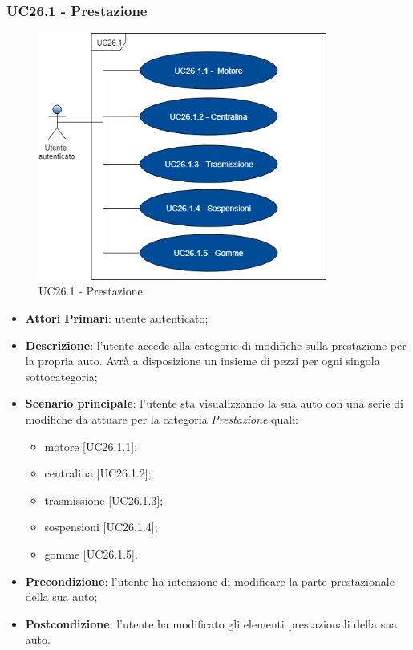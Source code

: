 \subsubsection{UC26.1 - Prestazione}
\begin{figure}[h]
	\includegraphics[width=9.5cm]{res/images/UC26-1Prestazioni.png}
	\centering
	\caption{UC26.1 - Prestazione}
\end{figure}
\begin{itemize}
	\item \textbf{Attori Primari}: utente autenticato;
	\item \textbf{Descrizione}: l'utente accede alla categorie di modifiche sulla prestazione per la propria auto. Avrà a disposizione un insieme di pezzi per ogni singola sottocategoria;
	\item \textbf{Scenario principale}: l'utente sta visualizzando la sua auto con una serie di modifiche da attuare per la categoria \textit{Prestazione} quali:
	\begin{itemize}
		\item motore [UC26.1.1];
		\item centralina [UC26.1.2];
		\item trasmissione [UC26.1.3];
		\item sospensioni [UC26.1.4];
		\item gomme [UC26.1.5].
	\end{itemize}
	\item \textbf{Precondizione}: l'utente ha intenzione di modificare la parte prestazionale della sua auto;
	\item \textbf{Postcondizione}: l'utente ha modificato gli elementi prestazionali della sua auto.
\end{itemize}
